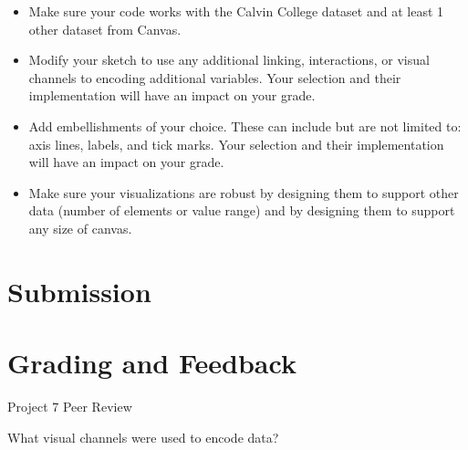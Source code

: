 \documentclass[a4paper,12pt]{article}
\begin{document}
\begin{itemize}
\item Make sure your code works with the Calvin College dataset and at least 1 other dataset from Canvas.

\item Modify your sketch to use any additional linking, interactions, or visual channels to encoding additional variables. Your selection and their implementation will have an impact on your grade.

\item Add embellishments of your choice. These can include but are not limited to: axis lines, labels, and tick marks. Your selection and their implementation will have an impact on your grade.

\item Make sure your visualizations are robust by designing them to support other data (number of elements or value range) and by designing them to support any size of canvas.

\end{itemize}


\section{Submission}


\section{Grading and Feedback}

\feedback










\newpage


\begin{center}
{\huge Project 7 Peer Review}
\end{center}





	{What visual channels were used to encode data? }
    { 
    }
        
\end{document}
